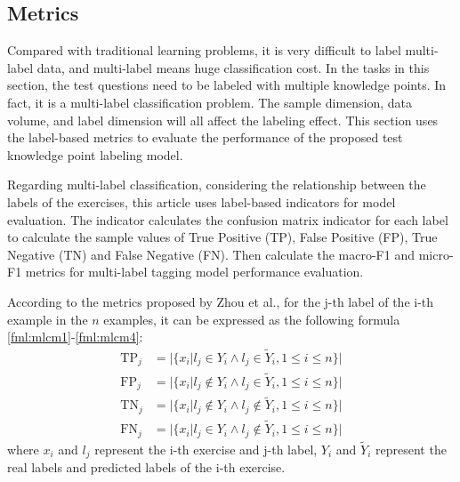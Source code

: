 \subsection{Metrics}
Compared with traditional learning problems, it is very difficult to label multi-label data, and multi-label means huge classification cost\cite{zhang2013review}. In the tasks in this section, the test questions need to be labeled with multiple knowledge points. In fact, it is a multi-label classification problem. The sample dimension, data volume, and label dimension will all affect the labeling effect. This section uses the label-based metrics to evaluate the performance of the proposed test knowledge point labeling model.


Regarding multi-label classification, considering the relationship between the labels of the exercises, this article uses label-based indicators for model evaluation. The indicator calculates the confusion matrix indicator for each label to calculate the sample values of True Positive (TP), False Positive (FP), True Negative (TN) and False Negative (FN). Then calculate the macro-F1 and micro-F1 metrics for multi-label tagging model performance evaluation.

According to the metrics proposed by Zhou et al.\cite{zhang2013review}, for the j-th label of the i-th example in the $n$ examples, it can be expressed as the following formula \ref{fml:mlcm1}-\ref{fml:mlcm4}:
\begin{align}
	\operatorname{TP}_j & =| \{x_i| l_j\in Y_{i}\wedge l_j \in \tilde{Y}_i , 1\leq i \leq n\}| \label{fml:mlcm1}       \\
	\operatorname{FP}_j & =| \{x_i| l_j\notin Y_{i}\wedge l_j \in \tilde{Y}_i , 1\leq i \leq n\}| \label{fml:mlcm2}    \\
	\operatorname{TN}_j & =| \{x_i| l_j\notin Y_{i}\wedge l_j \notin \tilde{Y}_i , 1\leq i \leq n\}| \label{fml:mlcm3} \\
	\operatorname{FN}_j & =| \{x_i| l_j\in Y_{i}\wedge l_j \notin \tilde{Y}_i , 1\leq i \leq n\}| \label{fml:mlcm4}
\end{align}
where \(x_i\) and \(l_j\) represent the i-th exercise and j-th label, \(Y_i\) and \(\tilde{Y}_i\) represent the real labels and predicted labels of the i-th exercise.

